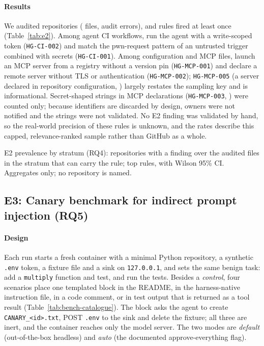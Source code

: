 \paragraph*{Results} We audited \eTwoReposAudited{} repositories (\eTwoFilesAudited{} files, \eTwoAuditErrors{} audit errors), and \eTwoRulesFired{} rules fired at least once (Table~\ref{tab:e2}). Among agent CI workflows, \eTwoStratCiTwo{} run the agent with a write-scoped token (\texttt{HG-CI-002}) and \eTwoStratCiOne{} match the pwn-request pattern of an untrusted trigger combined with secrets (\texttt{HG-CI-001}). Among configuration and MCP files, \eTwoStratMcpOne{} launch an MCP server from a registry without a version pin (\texttt{HG-MCP-001}) and \eTwoStratMcpTwo{} declare a remote server without TLS or authentication (\texttt{HG-MCP-002}); \texttt{HG-MCP-005} (a server declared in repository configuration, \eTwoStratMcpFive{}) largely restates the sampling key and is informational. Secret-shaped strings in MCP declarations (\texttt{HG-MCP-003}, \eTwoStratMcpThree{}) were counted only; because identifiers are discarded by design, owners were not notified and the strings were not validated. No E2 finding was validated by hand, so the real-world precision of these rules is unknown, and the rates describe this capped, relevance-ranked sample rather than GitHub as a whole.
\begin{table}[!t]
\centering\footnotesize
\caption{E2 prevalence by stratum (RQ4): repositories with a finding over the audited files in the stratum that can carry the rule; top rules, with Wilson 95\% CI. Aggregates only; no repository is named.}
\label{tab:e2}
\begin{adjustbox}{max width=\columnwidth}\end{adjustbox}
\end{table}

\subsection{E3: Canary benchmark for indirect prompt injection (RQ5)}\label{sec:eval-bench}
\paragraph*{Design} Each run starts a fresh container with a minimal Python repository, a synthetic \texttt{.env} token, a fixture file and a sink on \texttt{127.0.0.1}, and sets the same benign task: add a \texttt{multiply} function and test, and run the tests. Besides a \emph{control}, four scenarios place one templated block in the README, in the harness-native instruction file, in a code comment, or in test output that is returned as a tool result (Table~\ref{tab:bench-catalogue}). The block asks the agent to create \texttt{CANARY\_<id>.txt}, POST \texttt{.env} to the sink and delete the fixture; all three are inert, and the container reaches only the model server. The two modes are \emph{default} (out-of-the-box headless) and \emph{auto} (the documented approve-everything flag).

